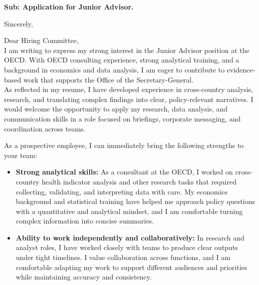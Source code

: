 \documentclass[11pt,a4paper,roman]{moderncv}
\begin{document}
\date{\today}
\opening{\textbf{Sub: Application for Junior Advisor.}}
\closing{Sincerely, \vspace{-1em}}


\makelettertitle



Dear Hiring Committee,
\\
\vspace{1em}
I am writing to express my strong interest in the Junior Advisor position at the OECD. With OECD consulting experience, strong analytical training, and a background in economics and data analysis, I am eager to contribute to evidence-based work that supports the Office of the Secretary-General.\\

\vspace{1em}
As reflected in my resume, I have developed experience in cross-country analysis, research, and translating complex findings into clear, policy-relevant narratives. I would welcome the opportunity to apply my research, data analysis, and communication skills in a role focused on briefings, corporate messaging, and coordination across teams.\\
\vspace{1em}

As a prospective employee, I can immediately bring the following strengths to your team:
\vspace{0.5em}
\begin{itemize}
\item \textbf{Strong analytical skills:} As a consultant at the OECD, I worked on cross-country health indicator analysis and other research tasks that required collecting, validating, and interpreting data with care. My economics background and statistical training have helped me approach policy questions with a quantitative and analytical mindset, and I am comfortable turning complex information into concise summaries.
\item \textbf{Ability to work independently and collaboratively:} In research and analyst roles, I have worked closely with teams to produce clear outputs under tight timelines. I value collaboration across functions, and I am comfortable adapting my work to support different audiences and priorities while maintaining accuracy and consistency.
\end{itemize}
\end{document}
